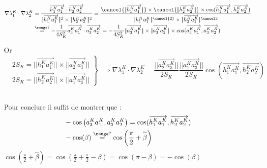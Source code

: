\documentclass[12pt,a4paper]{article}
\begin{document}
\begin{sol}
	$\begin{aligned}
		\nabla\lambda_1^K \cdot\nabla\lambda_2^K &= \dfrac{\overrightarrow{h_1^Ka_1^K}\cdot\overrightarrow{h_2^Ka_2^K}}{|\!|\overrightarrow{h_1^Ka_1^K}|\!|^2 \times |\!| h_2^K a_2^K|\!|^2} = \dfrac{\cancel{|\!|\overrightarrow{h_1^Ka_1^K}|\!|}\times \cancel{|\!|\overrightarrow{h_2^Ka_2^K}|\!|} \times\cos(\overrightarrow{h_1^Ka_1^K},\overrightarrow{h_2^Ka_2^K})}{|\!|h_1^Ka_1^K|\!|^{\cancel{2}}\times|\!|\overrightarrow{h_2^Ka_2^K}|\!|^{\cancel2}}\\
		&\overset{\rouge?}= -\dfrac1{4S_K^2}\overrightarrow{a_3^Ka_1^K}\cdot\overrightarrow{a_3^Ka_2^K} = -\dfrac1{4S_K^2}|\!|\overrightarrow{a_3^Ka_1^K}|\!|\times|\!|\overrightarrow{a_3^Ka_2^K}|\!|\times\cos(\overrightarrow{a_3^Ka_1^K},\overrightarrow{a_3^Ka_2^K})
	\end{aligned}$\\
	\begin{minipage}[t]{18cm}
		Or $\left.\begin{aligned}
		&2S_K = |\!|\overrightarrow{h_1^Ka_1^K}|\!|\times|\!|\overrightarrow{a_2^Ka_3^K}|\!|\\
		&2S_K = |\!|\overrightarrow{h_2^Ka_2^K}|\!|\times|\!|\overrightarrow{a_1^Ka_3^K}|\!|
	\end{aligned}\right\} \implies \nabla\lambda_1^K\cdot\nabla\lambda_2^K = \dfrac{|\!|\overrightarrow{a_2^Ka_3^K}|\!|}{2S_K}\dfrac{|\!|\overrightarrow{a_1^Ka_3^K}|\!|}{2S_K}\cos\left(\overrightarrow{h_1^Ka_1^K},\overrightarrow{h_2^Ka_2^K}\right)$
	\end{minipage}\\
	Pour conclure il suffit de montrer que :
	\[
	\begin{aligned}
		&-\cos\left(a_3^Ka_1^K,a_3^Ka_2^K\right) = \cos(\overrightarrow{h_1^Ka_1^K},\overrightarrow{h_2^Ka_2^K})\\
		&- \cos(\beta) \overset{\rouge?}= \cos\left(\frac\pi2+\overset\sim\beta\right)
	\end{aligned}
	\]
	$\cos\left(\frac\pi2+\overset\sim\beta\right)=\cos\left(\frac\pi2+\frac\pi2-\beta\right) = \cos\left(\pi-\beta\right) = - \cos(\beta)$\\
	\\
	

\end{sol}
\end{document}
